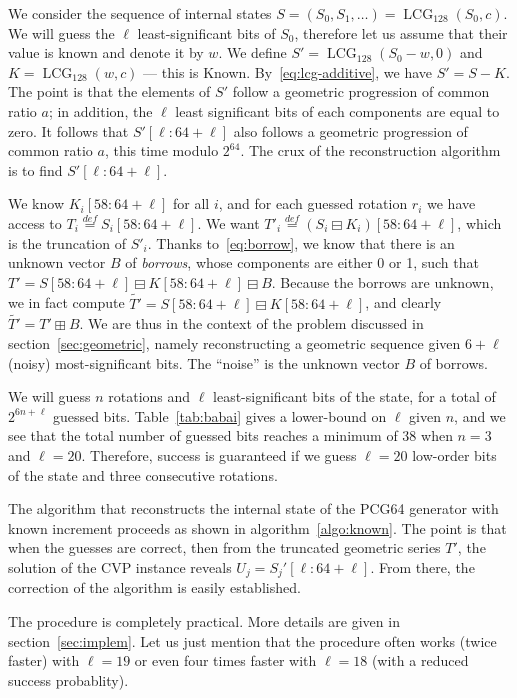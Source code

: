 \documentclass[submission,svgnames,journal=tosc]{iacrtrans}
\DeclareMathOperator{\LCG}{LCG}
\begin{document}
We consider the sequence of internal states
$S = (S_0, S_1, \dots) = \LCG_{128}(S_0, c)$. We will guess the $\ell$
least-significant bits of $S_0$, therefore let us assume that their value is
known and denote it by $w$. We define $S' = \LCG_{128}(S_0 - w, 0)$ and
$K = \LCG_{128}(w, c)$ --- this is Known. By~\eqref{eq:lcg-additive}, we have
$S' = S - K$. The point is that the elements of $S'$ follow a geometric
progression of common ratio $a$; in addition, the $\ell$ least significant bits
of each components are equal to zero. It follows that $S'[\ell:64+\ell]$ also
follows a geometric progression of common ratio $a$, this time modulo
$2^{64}$. The crux of the reconstruction algorithm is to find
$S'[\ell:64+\ell]$.

We know $K_i[58:64+\ell]$ for all $i$, and for each guessed rotation $r_i$ we
have access to $T_i \stackrel{def}{=} S_i[58:64+\ell]$.  We want
$T'_i \stackrel{def}{=} (S_i \boxminus K_i)[58:64+\ell]$, which is the
truncation of $S'_i$. Thanks to~\eqref{eq:borrow}, we know that there is an
unknown vector $B$ of \emph{borrows}, whose components are either 0 or 1, such
that $T' = S[58:64+\ell] \boxminus K[58:64+\ell] \boxminus B$. Because the
borrows are unknown, we in fact compute
$\widetilde{T'} = S[58:64+\ell] \boxminus K[58:64+\ell]$, and clearly
$\widetilde{T'} = T' \boxplus B$. We are thus in the context of the problem
discussed in section~\ref{sec:geometric}, namely reconstructing a geometric
sequence given $6+\ell$ (noisy) most-significant bits. The ``noise'' is the
unknown vector $B$ of borrows. %

We will guess $n$ rotations and $\ell$ least-significant bits of the state, for
a total of $2^{6n + \ell}$ guessed bits. Table~\ref{tab:babai} gives a
lower-bound on $\ell$ given $n$, and we see that the total number of guessed
bits reaches a minimum of $38$ when $n=3$ and $\ell=20$. Therefore, success is
guaranteed if we guess $\ell = 20$ low-order bits of the state and three
consecutive rotations.

The algorithm that reconstructs the internal state of the \textsf{PCG64}
generator with known increment proceeds as shown in
algorithm~\ref{algo:known}. The point is that when the guesses are correct, then
from the truncated geometric series $T'$, the solution of the CVP instance
reveals $U_j = S_j'[\ell:64+\ell]$. From there, the correction of the algorithm
is easily established.

The procedure is completely practical. More details are given in
section~\ref{sec:implem}. Let us just mention that the procedure often works
(twice faster) with $\ell=19$ or even four times faster with $\ell = 18$ (with a
reduced success probablity).
\end{document}
